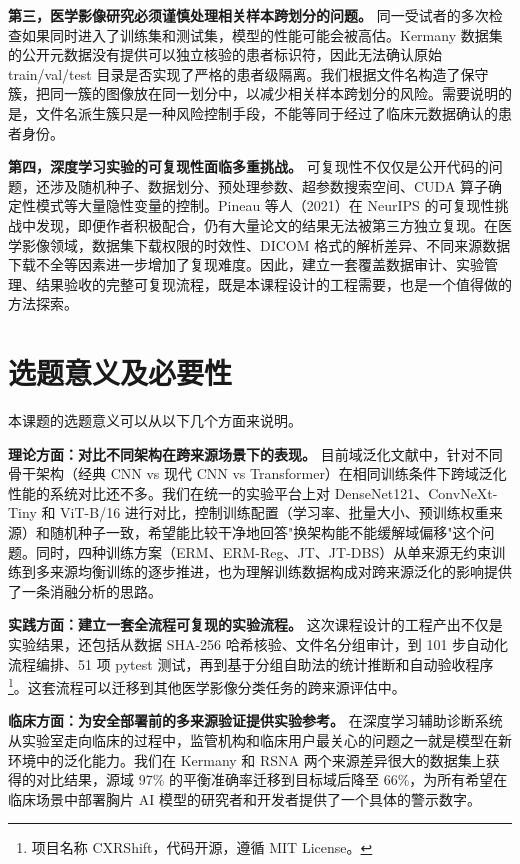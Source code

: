 \documentclass[12pt,a4paper,UTF8,openany]{ctexbook}
\begin{document}
\textbf{第三，医学影像研究必须谨慎处理相关样本跨划分的问题。} 同一受试者的多次检查如果同时进入了训练集和测试集，模型的性能可能会被高估。Kermany 数据集的公开元数据没有提供可以独立核验的患者标识符，因此无法确认原始 train/val/test 目录是否实现了严格的患者级隔离。我们根据文件名构造了保守簇，把同一簇的图像放在同一划分中，以减少相关样本跨划分的风险。需要说明的是，文件名派生簇只是一种风险控制手段，不能等同于经过了临床元数据确认的患者身份。

\textbf{第四，深度学习实验的可复现性面临多重挑战。} 可复现性不仅仅是公开代码的问题，还涉及随机种子、数据划分、预处理参数、超参数搜索空间、CUDA 算子确定性模式等大量隐性变量的控制。Pineau 等人（2021）在 NeurIPS 的可复现性挑战中发现，即便作者积极配合，仍有大量论文的结果无法被第三方独立复现。在医学影像领域，数据集下载权限的时效性、DICOM 格式的解析差异、不同来源数据下载不全等因素进一步增加了复现难度。因此，建立一套覆盖数据审计、实验管理、结果验收的完整可复现流程，既是本课程设计的工程需要，也是一个值得做的方法探索。

\section{选题意义及必要性}

本课题的选题意义可以从以下几个方面来说明。

\textbf{理论方面：对比不同架构在跨来源场景下的表现。} 目前域泛化文献中，针对不同骨干架构（经典 CNN vs 现代 CNN vs Transformer）在相同训练条件下跨域泛化性能的系统对比还不多。我们在统一的实验平台上对 DenseNet121、ConvNeXt-Tiny 和 ViT-B/16 进行对比，控制训练配置（学习率、批量大小、预训练权重来源）和随机种子一致，希望能比较干净地回答"换架构能不能缓解域偏移"这个问题。同时，四种训练方案（ERM、ERM-Reg、JT、JT-DBS）从单来源无约束训练到多来源均衡训练的逐步推进，也为理解训练数据构成对跨来源泛化的影响提供了一条消融分析的思路。

\textbf{实践方面：建立一套全流程可复现的实验流程。} 这次课程设计的工程产出不仅是实验结果，还包括从数据 SHA-256 哈希核验、文件名分组审计，到 101 步自动化流程编排、51 项 pytest 测试，再到基于分组自助法的统计推断和自动验收程序\footnote{项目名称 CXRShift，代码开源，遵循 MIT License。}。这套流程可以迁移到其他医学影像分类任务的跨来源评估中。

\textbf{临床方面：为安全部署前的多来源验证提供实验参考。} 在深度学习辅助诊断系统从实验室走向临床的过程中，监管机构和临床用户最关心的问题之一就是模型在新环境中的泛化能力。我们在 Kermany 和 RSNA 两个来源差异很大的数据集上获得的对比结果，源域 97\% 的平衡准确率迁移到目标域后降至 66\%，为所有希望在临床场景中部署胸片 AI 模型的研究者和开发者提供了一个具体的警示数字。
\end{document}
